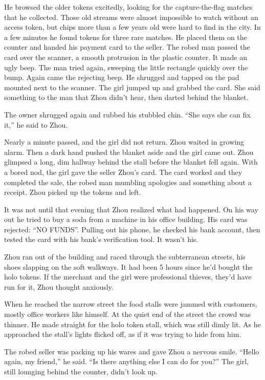 \documentclass[10pt,b5paper]{article}
\begin{document}
He browsed the older tokens excitedly, looking for the
capture-the-flag matches that he collected. Those old streams
were almost impossible to watch without an access token, but chips
more than a few years old were hard to find in the city. In a few
minutes he found tokens for three rare matches. He placed them on
the counter and handed his payment card to the seller. The robed
man passed the card over the scanner, a smooth protrusion in the
plastic counter. It made an ugly beep. The man tried again, sweeping
the little rectangle quickly over the bump. Again came the rejecting
beep. He shrugged and tapped on the pad mounted next to the scanner.
The girl jumped up and grabbed the card. She said something to the
man that Zhou didn't hear, then darted behind the blanket.

The owner shrugged again and rubbed his stubbled chin. ``She says
she can fix it,'' he said to Zhou.

Nearly a minute passed, and the girl did not return. Zhou waited in
growing alarm. Then a dark hand pushed the blanket aside and the
girl came out. Zhou glimpsed a long, dim hallway behind the stall
before the blanket fell again. With a bored nod, the girl gave the
seller Zhou's card. The card worked and they completed the sale,
the robed man mumbling apologies and something about a receipt. Zhou
picked up the tokens and left.

It was not until that evening that Zhou realized what had
happened. On his way out he tried to buy a soda from a machine in
his office building. His card was rejected: ``NO FUNDS''. Pulling out
his phone, he checked his bank account, then tested the card with
his bank's verification tool. It wasn't his.

Zhou ran out of the building and raced through the subterranean
streets, his shoes slapping on the soft walkways. It had been
5 hours since he'd bought the holo tokens. If the merchant and
the girl were professional thieves, they'd have run for it, Zhou
thought anxiously.

When he reached the narrow street the food stalls were jammed
with customers, mostly office workers like himself. At the quiet
end of the street the crowd was thinner. He made straight for the
holo token stall, which was still dimly lit. As he approached the
stall's lights flicked off, as if it was trying to hide from him.

The robed seller was packing up his wares and gave Zhou a nervous
smile. ``Hello again, my friend,'' he said. ``Is there anything else
I can do for you?'' The girl, still lounging behind the counter,
didn't look up.
\end{document}
